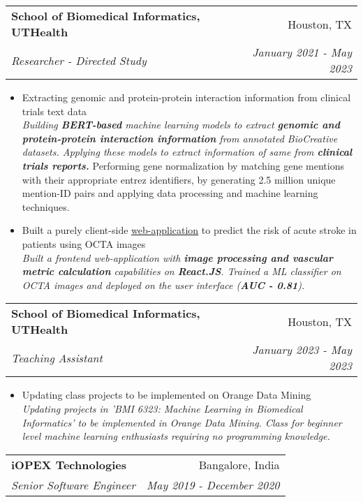 \documentclass[a4paper,10.8pt]{article}
\makeatletter
\newcommand{\resumeSubheading}[4]{
  \vspace{-1pt}\item
    \begin{tabular*}{0.97\textwidth}{l@{\extracolsep{\fill}}r}
      \textbf{#1} & #2 \\
      \textit{\small#3} & \textit{\small #4} \\
    \end{tabular*}\vspace{-5pt}
}
\makeatother
\begin{document}
    \resumeSubheading
    {School of Biomedical Informatics, UTHealth}{Houston, TX}
    {Researcher - Directed Study}{January 2021 - May 2023}
    \begin{itemize}
        \item Extracting genomic and protein-protein interaction information from clinical trials text data\\
        \textit{Building \textbf{BERT-based} machine learning models to extract \textbf{genomic and protein-protein interaction information} from annotated BioCreative datasets.
        Applying these models to extract information of same from \textbf{clinical trials reports.}} 
        Performing gene normalization by matching gene mentions with their appropriate entrez identifiers, by generating 2.5 million unique mention-ID pairs and applying data processing and machine learning techniques.
        \item Built a purely client-side \href{https://retina.chinmaymokashi.page}{\underline{web-application}} to predict the risk of acute stroke in patients using OCTA images\\
        \textit{Built a frontend web-application with \textbf{image processing and vascular metric calculation} capabilities on \textbf{React.JS}. 
        Trained a ML classifier on OCTA images and deployed on the user interface (\textbf{AUC - 0.81}).}
    \end{itemize}

    \resumeSubheading
    {School of Biomedical Informatics, UTHealth}{Houston, TX}
    {Teaching Assistant}{January 2023 - May 2023}
    \begin{itemize}
      \item Updating class projects to be implemented on Orange Data Mining\\
      \textit{Updating projects in 'BMI 6323: Machine Learning in Biomedical Informatics' to be implemented in Orange Data Mining.
      Class for beginner level machine learning enthusiasts requiring no programming knowledge.
      }
    \end{itemize}

    \resumeSubheading
    {iOPEX Technologies}{Bangalore, India}
    {Senior Software Engineer}{May 2019 - December 2020}
      
\end{document}
